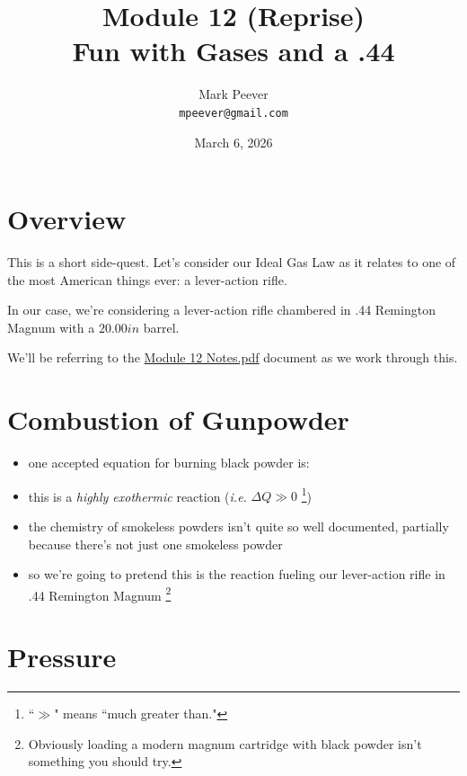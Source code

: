 \documentclass[11pt, oneside]{article}   	%
\title{Module 12 (Reprise)\\ Fun with Gases and a .44}
\author{Mark Peever\\ \texttt{mpeever@gmail.com}}
\date{March 6, 2026}
\begin{document}
\maketitle

\section{Overview}
This is a short side-quest.
Let's consider our Ideal Gas Law as it relates to one of the most American things ever: a lever-action rifle.

In our case, we're considering a lever-action rifle chambered in .44 Remington Magnum with a $20.00 in$ barrel.

We'll be referring to the  \href{https://drive.google.com/file/d/1JpZKagO_RQ2Az20Uw2yLxLpzfNrq7TlN/view?usp=sharing}{Module 12 Notes.pdf} document as we work through this.


\section{Combustion of Gunpowder}
\begin{itemize}
\item one accepted equation for burning black powder is:\\
   \cite{naval:gunpowder:combustion}
 \item this is a \emph{highly exothermic} reaction (\emph{i.e.} $\Delta Q \gg 0$ \footnote{``$\gg$" means ``much greater than."})
\item the chemistry of smokeless powders isn't quite so well documented, partially because there's not just one smokeless powder
\item so we're going to pretend this is the reaction fueling our lever-action rifle in .44 Remington Magnum
\footnote{Obviously loading a modern magnum cartridge with black powder isn't something you should try.}
\end{itemize}

\section{Pressure}
\end{document}
